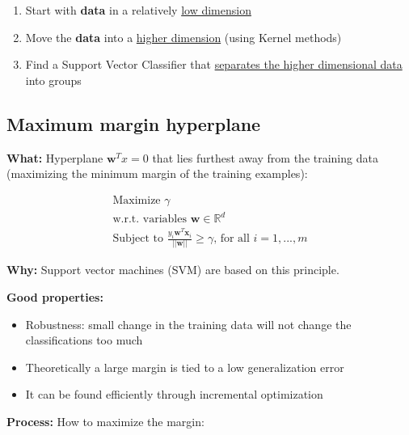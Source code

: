 \documentclass[12pt, a4paper]{article}
\begin{document}
\begin{enumerate}
  \item Start with \textbf{data} in a relatively \uline{low dimension}
  \item Move the \textbf{data} into a \uline{higher dimension} (using Kernel methods)
  \item Find a Support Vector Classifier that \uline{separates the higher dimensional data} into groups
\end{enumerate}






\subsection{Maximum margin hyperplane}\label{maximum-margin-hyperplane}

\textbf{What:} Hyperplane $\mathbf{w}^T x = 0$ that lies furthest away from the training data (maximizing the minimum margin of the training examples):

\begin{gather*}
\text{Maximize } \gamma \\
\text{w.r.t. variables } \mathbf{w} \in \mathbb{R}^d \\
\text{Subject to } \frac{y_i \mathbf{w}^T \mathbf{x}_i}{||\mathbf{w}||} \geq \gamma \text{, for all } i = 1, ..., m
\end{gather*}

\bigskip

\textbf{Why:} Support vector machines (SVM) are based on this principle.

\textbf{Good properties:}

\begin{itemize}
  \item Robustness: small change in the training data will not change the classifications too much
  \item Theoretically a large margin is tied to a low generalization error
  \item It can be found efficiently through incremental optimization
\end{itemize}

\bigskip

\textbf{Process:} How to maximize the margin:
\end{document}
